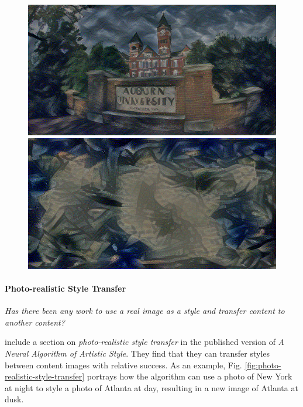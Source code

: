 \documentclass{article}
\begin{document}
\begin{figure}
\medskip

    \begin{minipage}{0.3\linewidth}
    \includegraphics[width=\textwidth]{img/content-layer-selection/block4_conv1}
    \end{minipage}
    \begin{minipage}{0.3\linewidth}
    \includegraphics[width=\textwidth]{img/content-layer-selection/block5_conv1}
    \end{minipage}

\end{figure}


\paragraph{Photo-realistic Style Transfer} \textit{Has there been any work to
use a real image as a style and transfer content to another content?}

\cite{gatys2016image} include a section on \textit{photo-realistic style
transfer} in the published version of \textit{A Neural Algorithm of Artistic
Style}. They find that they can transfer styles between content images with
relative success. As an example, Fig. \ref{fig:photo-realistic-style-transfer}
portrays how the algorithm can use a photo of New York at night to style a
photo of Atlanta at day, resulting in a new image of Atlanta at dusk.
\end{document}
